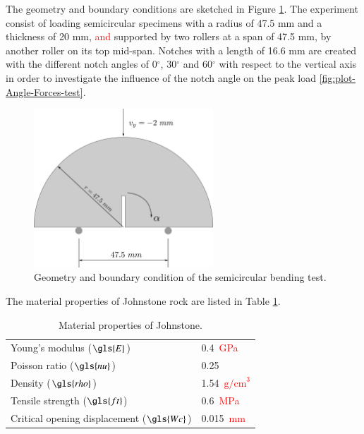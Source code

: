 \documentclass[preprint,12pt,a4paper]{elsarticle}
\begin{document}
The geometry and boundary conditions are sketched in Figure 
\ref{fig:geometry-Semicircular-bending-test}. The experiment consist of loading
semicircular specimens with a radius of 47.5 mm and a thickness of
20 mm, \textcolor{red}{and} supported by two rollers at a span of 47.5 mm, by
another roller on its top mid-span. Notches with a length of 16.6 mm are
created with the different notch angles of 0$^{\circ}$, 30$^{\circ}$ and 60$^{\circ}$ with respect
to the vertical axis in order to investigate the influence of the
notch angle on the peak load \ref{fig:plot-Angle-Forces-test}.
\begin{figure}
  \centering
  \includegraphics[width=0.6\textwidth]{./Figure-Semicircular-bending-test}
  \caption{Geometry and boundary condition of the semicircular bending
    test.}
  \label{fig:geometry-Semicircular-bending-test}
\end{figure}
The material properties of Johnstone rock are listed in Table \ref{tab:Johnstone-properties}.
\begin{table}
  \centering
  \begin{tabular}[]{l l}
    \hline
    Young's modulus ($\gls{E}$)   & 0.4\  \textcolor{red}{GPa}       \\
    Poisson ratio ($\gls{nu}$)    & 0.25           \\
    Density ($\gls{rho}$)         & 1.54\ \textcolor{red}{$\text{g/cm}^3$} \\
    Tensile strength ($\gls{ft}$) & 0.6\ \textcolor{red}{MPa}       \\
    Critical opening displacement ($\gls{Wc}$) & 0.015\ \textcolor{red}{mm} \\
    \hline
  \end{tabular}
  \caption[Mechanical properties of Johnstone. ]{Material properties of Johnstone.}
  \label{tab:Johnstone-properties}
\end{table}
\end{document}
